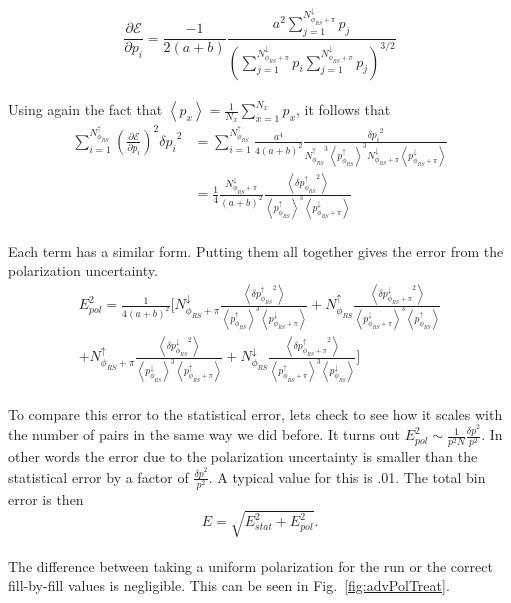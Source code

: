 \documentclass[letterpaper, abstract = on,listof=totoc, bibliography=totoc]{scrreprt}
\newcommand{\phirs}{\phi_{RS}}
\begin{document}
\begin{equation}
\label{eq:singleDeriv}
\frac{\partial\mathcal{E}}{\partial p_i} = \frac{-1}{2(a+b)} \frac{a^2 \sum\limits_{j=1}^{N^\downarrow_{\phirs+\pi}}p_j}{\left(\sum\limits_{j=1}^{N^\downarrow_{\phirs+\pi}}p_i \sum\limits_{j=1}^{N^\downarrow_{\phirs+\pi}} p_j\right)^{3/2}}
\end{equation}\\
%
Using again the fact that $\left<p_x\right> = \frac{1}{N_x}\sum\limits_{x=1}^{N_x} p_x$, it follows that 
\begin{align}
\sum\limits_{i=1}^{N^\uparrow_{\phirs}} \left(\frac{\partial\mathcal{E}}{\partial p_i}\right)^2 {\delta p_i}^2 &= \sum\limits_{i=1}^{N^\uparrow_{\phirs}} \frac{a^4}{4(a+b)^2} \frac{{\delta p_i}^2}{{N^\uparrow_{\phirs}}^3\left<p^\uparrow_{\phirs}\right>^3N^\downarrow_{\phirs+\pi}\left<p^\downarrow_{\phirs+\pi}\right>} \\
& = \frac{1}{4} \frac{N^\downarrow_{\phirs+\pi}}{(a+b)^2} \frac{\left<{\delta p^\uparrow_{\phirs}}^2\right>}{\left<p^\uparrow_{\phirs}\right>^3\left<p^\downarrow_{\phirs+\pi}\right>}
\end{align}\\
%
Each term has a similar form. Putting them all together gives the error from the polarization uncertainty. 
\begin{align}
E_{pol}^2 = \frac{1}{4(a+b)^2} \Biggl[ N^\downarrow_{\phirs+\pi} \frac{\left<{\delta p^\uparrow_{\phirs}}^2\right>}{\left<p^\uparrow_{\phirs}\right>^3\left<p^\downarrow_{\phirs+\pi}\right>} + N^\uparrow_{\phirs} \frac{\left<{\delta p^\downarrow_{\phirs+\pi}}^2\right>}{\left<p^\downarrow_{\phirs+\pi}\right>^3\left<p^\uparrow_{\phirs}\right>} \\ \nonumber
+  N^\uparrow_{\phirs+\pi} \frac{\left<{\delta p^\downarrow_{\phirs}}^2\right>}{\left<p^\downarrow_{\phirs}\right>^3\left<p^\uparrow_{\phirs+\pi}\right>} + N^\downarrow_{\phirs} \frac{\left<{\delta p^\uparrow_{\phirs+\pi}}^2\right>}{\left<p^\uparrow_{\phirs+\pi}\right>^3\left<p^\downarrow_{\phirs}\right>} \Biggr]
\end{align}\\
%

To compare this error to the statistical error, lets check to see how it scales with the number of pairs in the same way we did before. It turns out $E_{pol}^2 \sim \frac{1}{p^2N} \frac{{\delta p}^2}{p^2}$. In other words the error due to the polarization uncertainty is smaller than the statistical error by a factor of $\frac{{\delta p}^2}{p^2}$. A typical value for this is .01. The total bin error is then 
\begin{equation}
E = \sqrt{E_{stat}^2 + E_{pol}^2}.
\label{eq:errorAdv}
\end{equation}\\
The difference between taking a uniform polarization for the run or the correct fill-by-fill values is negligible.  This can be seen in Fig.~\ref{fig:advPolTreat}.  
\end{document}
